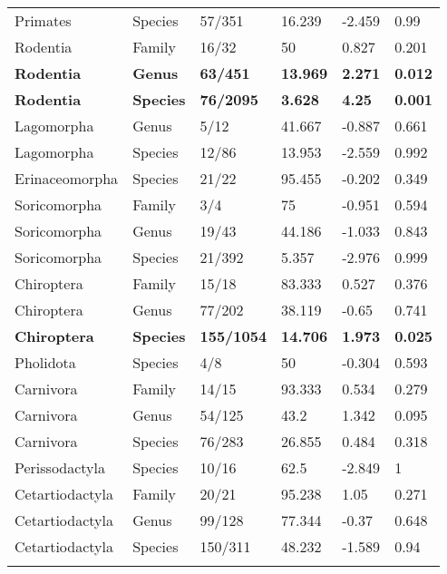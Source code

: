 \begin{longtable}{llllll}
  Primates & Species & 57/351 & 16.239 & -2.459 & 0.99 \\ 
  Rodentia & Family & 16/32 & 50 & 0.827 & 0.201 \\ 
  \textbf{Rodentia} & \textbf{Genus} & \textbf{63/451} & \textbf{13.969} & \textbf{2.271} & \textbf{0.012} \\ 
  \textbf{Rodentia} & \textbf{Species} & \textbf{76/2095} & \textbf{3.628} & \textbf{4.25} & \textbf{0.001} \\ 
  Lagomorpha & Genus & 5/12 & 41.667 & -0.887 & 0.661 \\ 
  Lagomorpha & Species & 12/86 & 13.953 & -2.559 & 0.992 \\ 
  Erinaceomorpha & Species & 21/22 & 95.455 & -0.202 & 0.349 \\ 
  Soricomorpha & Family & 3/4 & 75 & -0.951 & 0.594 \\ 
  Soricomorpha & Genus & 19/43 & 44.186 & -1.033 & 0.843 \\ 
  Soricomorpha & Species & 21/392 & 5.357 & -2.976 & 0.999 \\ 
  Chiroptera & Family & 15/18 & 83.333 & 0.527 & 0.376 \\ 
  Chiroptera & Genus & 77/202 & 38.119 & -0.65 & 0.741 \\ 
  \textbf{Chiroptera} & \textbf{Species} & \textbf{155/1054} & \textbf{14.706} & \textbf{1.973} & \textbf{0.025} \\ 
  Pholidota & Species & 4/8 & 50 & -0.304 & 0.593 \\ 
  Carnivora & Family & 14/15 & 93.333 & 0.534 & 0.279 \\ 
  Carnivora & Genus & 54/125 & 43.2 & 1.342 & 0.095 \\ 
  Carnivora & Species & 76/283 & 26.855 & 0.484 & 0.318 \\ 
  Perissodactyla & Species & 10/16 & 62.5 & -2.849 & 1 \\ 
  Cetartiodactyla & Family & 20/21 & 95.238 & 1.05 & 0.271 \\ 
  Cetartiodactyla & Genus & 99/128 & 77.344 & -0.37 & 0.648 \\ 
  Cetartiodactyla & Species & 150/311 & 48.232 & -1.589 & 0.94 \\ 
   \hline
\hline
\label{Supp_data_structureNTI}
\end{longtable}
